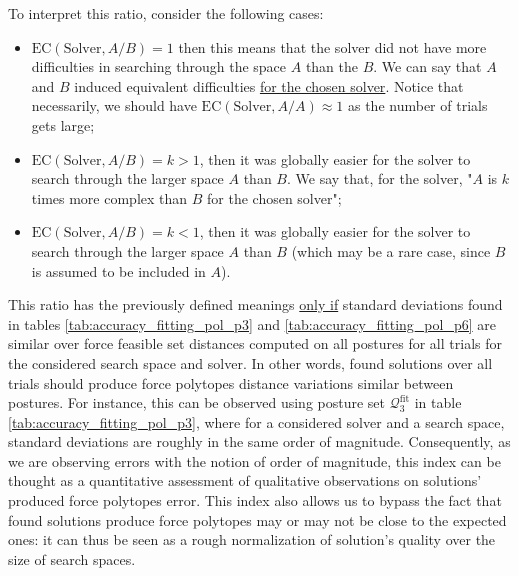 To interpret this ratio, consider the following cases:
\begin{itemize}
    \item {$\text{EC}(\text{Solver}, A/B) = 1$ then this means that the solver did not have more difficulties in searching through the space $A$ than the $B$. We can say that $A$ and $B$ induced equivalent difficulties \underline{for the chosen solver}. Notice that necessarily, we should have $\text{EC}(\text{Solver}, A/A) \approx 1$ as the number of trials gets large;}
    \item {$\text{EC}(\text{Solver}, A/B) = k > 1$, then it was globally easier for the solver to search through the larger space $A$ than $B$. We say that, for the solver, "$A$ is $k$ times more complex than $B$ for the chosen solver";}
    \item {$\text{EC}(\text{Solver}, A/B) = k < 1$, then it was globally easier for the solver to search through the larger space $A$ than $B$ (which may be a rare case, since $B$ is assumed to be included in $A$).}
\end{itemize}

This ratio has the previously defined meanings \underline{only if} standard deviations found in tables \ref{tab:accuracy_fitting_pol_p3} and \ref{tab:accuracy_fitting_pol_p6} are similar over force feasible set distances computed on all postures for all trials for the considered search space and solver. In other words, found solutions over all trials should produce force polytopes distance variations similar between postures. For instance, this can be observed using posture set $\mathcal{Q}_3^{\text{fit}}$ in table \ref{tab:accuracy_fitting_pol_p3}, where for a considered solver and a search space, standard deviations are roughly in the same order of magnitude. Consequently, as we are observing errors with the notion of order of magnitude, this index can be thought as a quantitative assessment of qualitative observations on solutions' produced force polytopes error. This index also allows us to bypass the fact that found solutions produce force polytopes may or may not be close to the expected ones: it can thus be seen as a rough normalization of solution's quality over the size of search spaces. 

